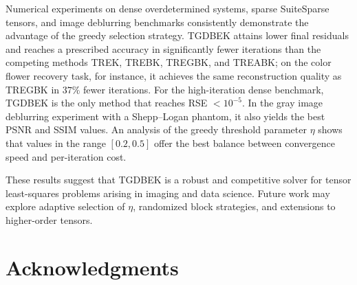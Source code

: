 \documentclass[11pt]{article}
\begin{document}
Numerical experiments on dense overdetermined systems, sparse SuiteSparse tensors, and image deblurring benchmarks consistently demonstrate the advantage of the greedy selection strategy. TGDBEK attains lower final residuals and reaches a prescribed accuracy in significantly fewer iterations than the competing methods TREK, TREBK, TREGBK, and TREABK; on the color flower recovery task, for instance, it achieves the same reconstruction quality as TREGBK in $37\%$ fewer iterations. For the high-iteration dense benchmark, TGDBEK is the only method that reaches RSE $< 10^{-5}$. In the gray image deblurring experiment with a Shepp--Logan phantom, it also yields the best PSNR and SSIM values. An analysis of the greedy threshold parameter $\eta$ shows that values in the range $[0.2, 0.5]$ offer the best balance between convergence speed and per-iteration cost.

These results suggest that TGDBEK is a robust and competitive solver for tensor least-squares problems arising in imaging and data science. Future work may explore adaptive selection of $\eta$, randomized block strategies, and extensions to higher-order tensors.
 


\section*{Acknowledgments}
\end{document}
